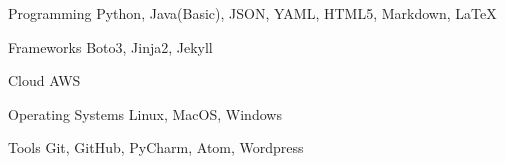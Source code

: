 

\begin{cvskills}

  \cvskill
    {Programming} %
    {Python, Java(Basic), JSON, YAML, HTML5, Markdown, LaTeX} %

  \cvskill
    {Frameworks} %
    {Boto3, Jinja2, Jekyll} %

  \cvskill
    {Cloud} %
    {AWS} %


  \cvskill
    {Operating Systems} %
    {Linux, MacOS, Windows} %


  \cvskill
    {Tools} %
    {Git, GitHub, PyCharm, Atom, Wordpress} %

\end{cvskills}
